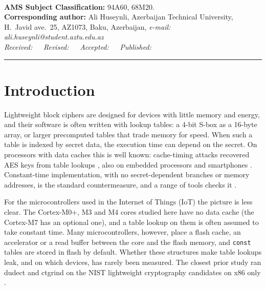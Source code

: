 \documentclass[11pt, a4paper, twoside, reqno]{article}
\begin{document}
\vspace{0.2cm}
\\
{\footnotesize{\textbf{AMS Subject Classification:} 94A60, 68M20.}}\\
{\footnotesize{\textbf{Corresponding author:} Ali Huseynli, Azerbaijan Technical University, H.~Javid ave.\ 25, AZ1073, Baku, Azerbaijan, {\color{blue}\em e-mail: ali.huseynli@student.aztu.edu.az}}}\\
{\footnotesize{\emph{Received: \,\,\,\,\, \hspace{0.1cm}Revised:
\,\,\,\,\, \hspace{0.1cm} Accepted: \,\,\,\,\,
\hspace{0.1cm}Published: \,\,\,\,\,}}} \vspace{0.2cm} \hrule

\section{Introduction}

Lightweight block ciphers are designed for devices with little memory and energy, and their software is often written with lookup tables: a 4-bit S-box as a 16-byte array, or larger precomputed tables that trade memory for speed. When such a table is indexed by secret data, the execution time can depend on the secret. On processors with data caches this is well known: cache-timing attacks recovered AES keys from table lookups \citep{bernstein2005,osvik2006,tromer2010}, also on embedded processors \citep{bogdanov2010} and smartphones \citep{lipp2016}. Constant-time implementation, with no secret-dependent branches or memory addresses, is the standard countermeasure, and a range of tools checks it \citep{langley2010,almeida2016,reparaz2017,daniel2020,geimer2023}.

For the microcontrollers used in the Internet of Things (IoT) the picture is less clear. The Cortex-M0+, M3 and M4 cores studied here have no data cache (the Cortex-M7 has an optional one), and a table lookup on them is often assumed to take constant time. Many microcontrollers, however, place a flash cache, an accelerator or a read buffer between the core and the flash memory, and \texttt{const} tables are stored in flash by default. Whether these structures make table lookups leak, and on which devices, has rarely been measured. The closest prior study ran dudect and ctgrind on the NIST lightweight cryptography candidates on x86 only \citep{hansen2020}.
\end{document}
